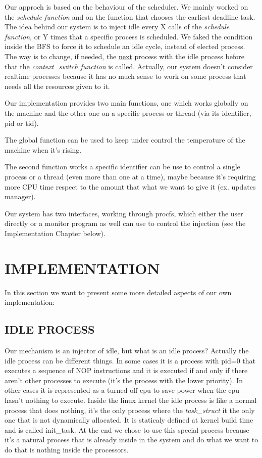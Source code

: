 \documentclass[journal]{IEEEtran}
\begin{document}
Our approch is based on the behaviour of the scheduler. We mainly
worked on the \textit{schedule function} and on the function that
chooses the earliest deadline task. The idea behind our system is
to inject idle every X calls of the \textit{schedule function}, or
Y times that a specific process is scheduled. We faked the condition
inside the BFS to force it to schedule an idle cycle, instead of elected
process. The way is to change, if needed, the \underline{next} process
with the idle process before that the \textit{context\_switch function}
is called. Actually, our system doesn't consider realtime processes
because it has no much sense to work on some process that needs all
the resources given to it.\medskip{}


Our implementation provides two main functions, one which works globally
on the machine and the other one on a specific process or thread (via
its identifier, pid or tid).

The global function can be used to keep under control the temperature
of the machine when it's rising.

The second function works a specific identifier can be use to control
a single process or a thread (even more than one at a time), maybe
because it's requiring more CPU time respect to the amount that what
we want to give it (ex. updates manager).

Our system has two interfaces, working through procfs, which either
the user directly or a monitor program as well can use to control
the injection (see the Implementation Chapter below).


\section{IMPLEMENTATION}
In this section we want to present some more detailed aspects of our own implementation:

\subsection{IDLE PROCESS}
Our mechanism is an injector of idle, but what is an idle process? 
Actually the idle process can be different things. In some cases it is a process with pid=0 that executes a sequence of NOP instructions and it is executed if and only if there aren't other processes to execute (it's the process with the lower priority). In other cases it is represented as a turned off cpu to save power when the cpu hasn't nothing to execute. Inside the linux kernel the idle process is like a normal process that does nothing, it's the only process where the \emph{task\_struct}  it the only one that is not dynamically allocated. It is staticaly defined  at kernel build time and is called init\_task. At the end we chose to use this special process because it's a natural process that is already inside in the system and do what we want to do that is nothing inside the processors. 
\end{document}
